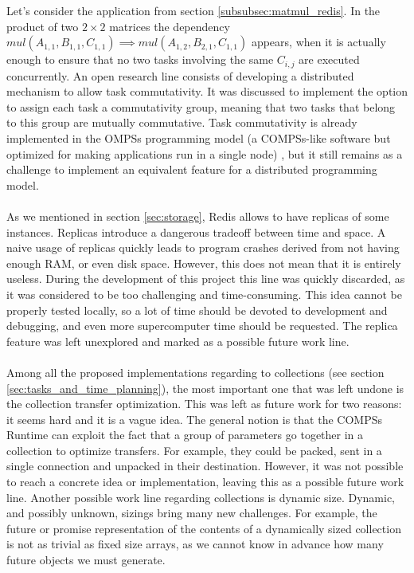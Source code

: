 Let's consider the application from section \ref{subsubsec:matmul_redis}. In the product of two $2 \times 2$ matrices the dependency $mul(A_{1, 1}, B_{1, 1}, C_{1, 1}) \implies mul(A_{1,2}, B_{2, 1}, C_{1, 1})$ appears, when it is actually enough to ensure that no two tasks involving the same $C_{i, j}$ are executed concurrently. An open research line consists of developing a distributed mechanism to allow task commutativity. It was discussed to implement the option to assign each task a commutativity group, meaning that two tasks that belong to this group are mutually commutative. Task commutativity is already implemented in the OMPSs programming model (a COMPSs-like software but optimized for making applications run in a single node) \cite{duran2011ompss}, but it still remains as a challenge to implement an equivalent feature for a distributed programming model.\\
\\
As we mentioned in section \ref{sec:storage}, Redis allows to have replicas of some instances. Replicas introduce a dangerous tradeoff between time and space. A naive usage of replicas quickly leads to program crashes derived from not having enough RAM, or even disk space. However, this does not mean that it is entirely useless. During the development of this project this line was quickly discarded, as it was considered to be too challenging and time-consuming. This idea cannot be properly tested locally, so a lot of time should be devoted to development and debugging, and even more supercomputer time should be requested. The replica feature was left unexplored and marked as a possible future work line.\\
\\
Among all the proposed implementations regarding to collections (see section \ref{sec:tasks_and_time_planning}), the most important one that was left undone is the collection transfer optimization. This was left as future work for two reasons: it seems hard and it is a vague idea. The general notion is that the COMPSs Runtime can exploit the fact that a group of parameters go together in a collection to optimize transfers. For example, they could be packed, sent in a single connection and unpacked in their destination. However, it was not possible to reach a concrete idea or implementation, leaving this as a possible future work line. Another possible work line regarding collections is dynamic size. Dynamic, and possibly unknown, sizings bring many new challenges. For example, the future or promise representation of the contents of a dynamically sized collection is not as trivial as fixed size arrays, as we cannot know in advance how many future objects we must generate.\\
